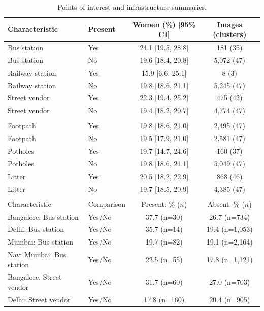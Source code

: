 \begin{table}[t]
\centering
\caption{Points of interest and infrastructure summaries.}
\label{tab:poi_infra}
\scriptsize
\begin{threeparttable}
\begin{tabular}{@{\extracolsep{0pt}}llcc}
\toprule
Characteristic & Present & Women (\%) [95\% CI] & Images (clusters) \\
\midrule
Bus station & Yes & 24.1 [19.5, 28.8] & 181 (35) \\
Bus station & No & 19.6 [18.4, 20.8] & 5,072 (47) \\
\addlinespace
Railway station & Yes & 15.9 [6.6, 25.1] & 8 (3) \\
Railway station & No & 19.8 [18.6, 21.1] & 5,245 (47) \\
\addlinespace
Street vendor & Yes & 22.3 [19.4, 25.2] & 475 (42) \\
Street vendor & No & 19.4 [18.2, 20.7] & 4,774 (47) \\
\addlinespace
\midrule
\multicolumn{4}{l}{\textit{Infrastructure and disorder (all cities pooled)}} \\
\midrule
Footpath & Yes & 19.8 [18.6, 21.0] & 2,495 (47) \\
Footpath & No & 19.5 [17.9, 21.0] & 2,581 (47) \\
\addlinespace
Potholes & Yes & 19.7 [14.7, 24.6] & 160 (37) \\
Potholes & No & 19.8 [18.6, 21.1] & 5,049 (47) \\
\addlinespace
Litter & Yes & 20.5 [18.2, 22.9] & 868 (46) \\
Litter & No & 19.7 [18.5, 20.9] & 4,385 (47) \\
\addlinespace
\midrule
\multicolumn{4}{l}{\textit{Points of interest by city}} \\
\midrule
Characteristic & Comparison & Present: \% ($n$) & Absent: \% ($n$) \\
\midrule
Bangalore: Bus station & Yes/No & 37.7 (n=30) & 26.7 (n=734) \\
Delhi: Bus station & Yes/No & 35.7 (n=14) & 19.4 (n=1,053) \\
Mumbai: Bus station & Yes/No & 19.7 (n=82) & 19.1 (n=2,164) \\
Navi Mumbai: Bus station & Yes/No & 22.5 (n=55) & 17.8 (n=1,121) \\
\addlinespace
Bangalore: Street vendor & Yes/No & 31.7 (n=60) & 27.0 (n=703) \\
Delhi: Street vendor & Yes/No & 17.8 (n=160) & 20.4 (n=905) \\

\end{tabular}
\end{threeparttable}
\end{table}
